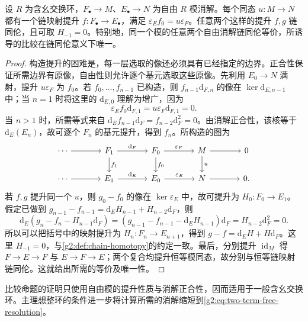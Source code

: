\begin{proposition}\label{g2:prop:resolution-comparison}
	设 \(R\) 为含幺交换环，\(F_\bullet\to M\)、\(E_\bullet\to N\) 为自由 \(R\) 模消解。每个同态 \(u:M\to N\) 都有一个链映射提升 \(f:F_\bullet\to E_\bullet\)，满足 \(\varepsilon_Ef_0=u\varepsilon_F\)。任意两个这样的提升 \(f,g\) 链同伦，且可取 \(H_{-1}=0\)。特别地，同一个模的任意两个自由消解链同伦等价，所诱导的比较在链同伦意义下唯一。
\end{proposition}
\begin{proof}
	构造提升的困难是，每一层选取的像还必须具有已经指定的边界。正合性保证所需边界有原像，自由性则允许逐个基元选取这些原像。先利用 \(E_0\to N\) 满射，提升 \(u\varepsilon_F\) 为 \(f_0\)。若 \(f_0,\ldots,f_{n-1}\) 已构造，则 \(f_{n-1}\mathrm{d}_{F,n}\) 的像在 \(\ker\mathrm{d}_{E,n-1}\) 中；当 \(n=1\) 时将这里的 \(\mathrm{d}_{E,0}\) 理解为增广，因为
	\[
		\varepsilon_Ef_0\mathrm{d}_{F,1}=u\varepsilon_F\mathrm{d}_{F,1}=0.
	\]
	当 \(n>1\) 时，所需等式来自 \(\mathrm{d}_Ef_{n-1}\mathrm{d}_F=f_{n-2}\mathrm{d}_F^2=0\)。由消解正合性，该核等于 \(\mathrm{d}_E(E_n)\)，故可逐个 \(F_n\) 的基元提升，得到 \(f_n\)。所构造的图为
	\[
		\begin{tikzcd}[column sep=large]
			\cdots\arrow[r] & F_1\arrow[r,"\mathrm{d}_F"]\arrow[d,"f_1"] & F_0\arrow[r,"\varepsilon_F"]\arrow[d,"f_0"] & M\arrow[r]\arrow[d,"u"] & 0 \\
			\cdots\arrow[r] & E_1\arrow[r,"\mathrm{d}_E"] & E_0\arrow[r,"\varepsilon_E"] & N\arrow[r] & 0 .
		\end{tikzcd}
	\]
	若 \(f,g\) 提升同一个 \(u\)，则 \(g_0-f_0\) 的像在 \(\ker\varepsilon_E\) 中，故可提升为 \(H_0:F_0\to E_1\)。假定已做到 \(g_{n-1}-f_{n-1}=\mathrm{d}_EH_{n-1}+H_{n-2}\mathrm{d}_F\)，则
	\[
		\mathrm{d}_E(g_n-f_n-H_{n-1}\mathrm{d}_F)
		=(g_{n-1}-f_{n-1}-\mathrm{d}_EH_{n-1})\mathrm{d}_F
		=H_{n-2}\mathrm{d}_F^2=0.
	\]
	所以可以把括号中的映射提升为 \(H_n:F_n\to E_{n+1}\)，得到 \(g-f=\mathrm{d}_EH+H\mathrm{d}_F\)。这里 \(H_{-1}=0\)，与\cref{g2:def:chain-homotopy}的约定一致。最后，分别提升 \(\operatorname{id}_M\) 得 \(F\to E\to F\) 与 \(E\to F\to E\)；两个复合均提升恒等模同态，故分别与恒等链映射链同伦。这就给出所需的等价及唯一性。
\end{proof}

比较命题的证明只使用自由模的提升性质与消解正合性，因而适用于一般含幺交换环。主理想整环的条件进一步将计算所需的消解缩短到\eqref{g2:eq:two-term-free-resolution}。


